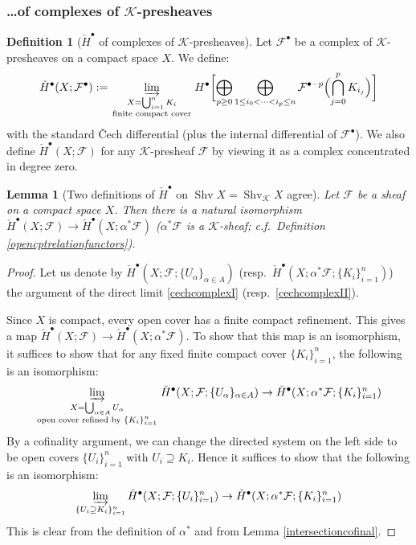 \documentclass[12pt]{article}
\newtheorem{lemma}[theorem]{Lemma}
\theoremstyle{definition}
\newtheorem{definition}[theorem]{Definition}
\theoremstyle{remark}
\numberwithin{equation}{subsection}
\newcommand{\F}{\mathcal F}
\newcommand{\K}{\mathcal K}
\newcommand{\cH}{\check H}
\newcommand{\Shv}{\operatorname{Shv}}
\begin{document}
\subsubsection{\ldots of complexes of \texorpdfstring{$\K$}{K}-presheaves}

\begin{definition}[$\cH^\bullet$ of complexes of $\K$-presheaves]\label{cechdefnII}
Let $\F^\bullet$ be a complex of $\K$-presheaves on a compact space $X$.  We define:
\begin{equation}\label{cechcomplexII}
\cH^\bullet(X;\F^\bullet):=\varinjlim_{\begin{smallmatrix}X=\bigcup_{i=1}^nK_i\cr\text{finite compact cover}\end{smallmatrix}}H^\bullet\biggl[\bigoplus_{p\geq 0}\bigoplus_{1\leq i_0<\cdots<i_p\leq n}\F^{\bullet-p}\Bigl(\bigcap_{j=0}^pK_{i_j}\Bigr)\biggr]
\end{equation}
with the standard \v Cech differential (plus the internal differential of $\F^\bullet$).  We also define $\cH^\bullet(X;\F)$ for any $\K$-presheaf $\F$ by viewing it as a complex concentrated in degree zero.
\end{definition}

\begin{lemma}[Two definitions of $\cH^\bullet$ on $\Shv X=\Shv_\K X$ agree]\label{cHsameforopencompactcovers}
Let $\F$ be a sheaf on a compact space $X$.  Then there is a natural isomorphism $\cH^\bullet(X;\F)\to\cH^\bullet(X;\alpha^\ast\F)$ ($\alpha^\ast\F$ is a $\K$-sheaf; c.f.\ Definition \ref{opencptrelationfunctors}).
\end{lemma}

\begin{proof}
Let us denote by $\cH^\bullet(X;\F;\{U_\alpha\}_{\alpha\in A})$ (resp.\ $\cH^\bullet(X;\alpha^\ast\F;\{K_i\}_{i=1}^n)$) the argument of the direct limit \eqref{cechcomplexI} (resp.\ \eqref{cechcomplexII}).

Since $X$ is compact, every open cover has a finite compact refinement.  This gives a map $\cH^\bullet(X;\F)\to\cH^\bullet(X;\alpha^\ast\F)$.  To show that this map is an isomorphism, it suffices to show that for any fixed finite compact cover $\{K_i\}_{i=1}^n$, the following is an isomorphism:
\begin{equation}
\varinjlim_{\begin{smallmatrix}X=\bigcup_{\alpha\in A}U_\alpha\cr\text{open cover refined by }\{K_i\}_{i=1}^n\end{smallmatrix}}\cH^\bullet(X;\F;\{U_\alpha\}_{\alpha\in A})\to\cH^\bullet(X;\alpha^\ast\F;\{K_i\}_{i=1}^n)
\end{equation}
By a cofinality argument, we can change the directed system on the left side to be open covers $\{U_i\}_{i=1}^n$ with $U_i\supseteq K_i$.  Hence it suffices to show that the following is an isomorphism:
\begin{equation}
\varinjlim_{\{U_i\supseteq K_i\}_{i=1}^n}\cH^\bullet(X;\F;\{U_i\}_{i=1}^n)\to\cH^\bullet(X;\alpha^\ast\F;\{K_i\}_{i=1}^n)
\end{equation}
This is clear from the definition of $\alpha^\ast$ and from Lemma \ref{intersectioncofinal}.
\end{proof}
\end{document}
